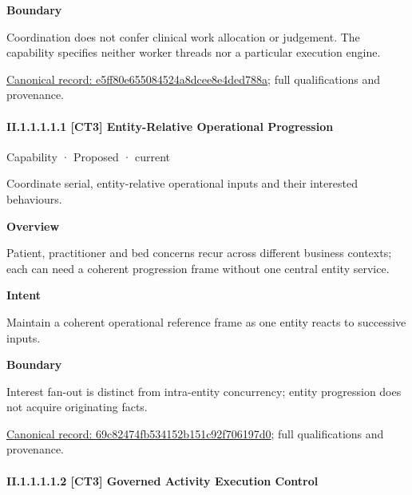 \textbf{Boundary}



Coordination does not confer clinical work allocation or judgement. The capability specifies neither worker threads nor a particular execution engine.


{\footnotesize \href{../../../../../../../continuum/strategy/capability/e5ff80e655084524a8dcee8e4ded788a.md}{Canonical record: e5ff80e655084524a8dcee8e4ded788a}; full qualifications and provenance.}\par
\paragraph*{II.1.1.1.1.1 [CT3] Entity-Relative Operational Progression}
\label{navigation:II.1.1.1.1.1}

\label{element:69c82474fb534152b151c92f706197d0}
{\small Capability · Proposed · current}\par

Coordinate serial, entity-relative operational inputs and their interested behaviours.



\textbf{Overview}



Patient, practitioner and bed concerns recur across different business contexts; each can need a coherent progression frame without one central entity service.



\textbf{Intent}



Maintain a coherent operational reference frame as one entity reacts to successive inputs.



\textbf{Boundary}



Interest fan-out is distinct from intra-entity concurrency; entity progression does not acquire originating facts.


{\footnotesize \href{../../../../../../../continuum/strategy/capability/69c82474fb534152b151c92f706197d0.md}{Canonical record: 69c82474fb534152b151c92f706197d0}; full qualifications and provenance.}\par
\paragraph*{II.1.1.1.1.2 [CT3] Governed Activity Execution Control}
\label{navigation:II.1.1.1.1.2}

